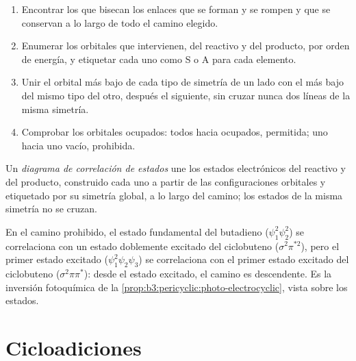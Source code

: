 \begin{method}\label{met:b3:pericyclic:correlation-diagram}
\begin{enumerate}
  \item Encontrar los  que bisecan los enlaces que se forman y se rompen y que se
        conservan a lo largo de todo el camino elegido.
  \item Enumerar los orbitales que intervienen, del reactivo y del producto, por orden de
        energía, y etiquetar cada uno como S o A para cada elemento.
  \item Unir el orbital más bajo de cada tipo de simetría de un lado con el más bajo
        del mismo tipo del otro, después el siguiente, sin cruzar nunca dos líneas de la
        misma simetría.
  \item Comprobar los orbitales ocupados: todos hacia ocupados, permitida; uno hacia uno vacío,
        prohibida.
\end{enumerate}
\end{method}

\begin{definition}\label{def:b3:pericyclic:state-correlation}
Un \emph{diagrama de correlación de estados} une los
estados electrónicos del reactivo y del producto, construido cada uno a partir de las configuraciones
orbitales y etiquetado por su simetría global, a lo largo del camino; los estados de
la misma simetría no se cruzan.
\end{definition}

En el camino  prohibido, el estado fundamental del butadieno ($\psi_1^2\psi_2^2$)
se correlaciona con un estado doblemente excitado del ciclobuteno ($\sigma^2\pi^{*2}$), pero el primer estado
excitado ($\psi_1^2\psi_2\psi_3$) se correlaciona con el primer estado excitado del ciclobuteno ($\sigma^2\pi\pi^*$): desde el
estado excitado, el camino  es descendente. Es la inversión fotoquímica
de la \cref{prop:b3:pericyclic:photo-electrocyclic}, vista sobre los estados.

\section{Cicloadiciones}

